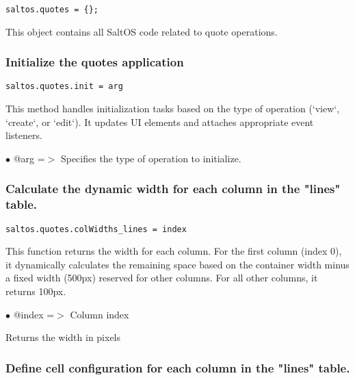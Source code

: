 \documentclass[a4paper]{article}
\begin{document}
\begin{lstlisting}
saltos.quotes = {};
\end{lstlisting}

This object contains all SaltOS code related to quote operations.

\hypertarget{toc40}{}
\subsubsection{Initialize the quotes application}

\begin{lstlisting}
saltos.quotes.init = arg
\end{lstlisting}

This method handles initialization tasks based on the type of operation (`view`, `create`, or `edit`).
It updates UI elements and attaches appropriate event listeners.

\begin{compactitem}
\item[\color{myblue}$\bullet$] @arg =$>$ Specifies the type of operation to initialize.
\end{compactitem}

\hypertarget{toc41}{}
\subsubsection{Calculate the dynamic width for each column in the "lines" table.}

\begin{lstlisting}
saltos.quotes.colWidths_lines = index
\end{lstlisting}

This function returns the width for each column. For the first column (index 0),
it dynamically calculates the remaining space based on the container width minus
a fixed width (500px) reserved for other columns. For all other columns, it returns 100px.

\begin{compactitem}
\item[\color{myblue}$\bullet$] @index =$>$ Column index
\end{compactitem}

Returns the width in pixels

\hypertarget{toc42}{}
\subsubsection{Define cell configuration for each column in the "lines" table.}
\end{document}
